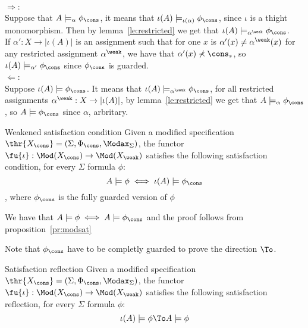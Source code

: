 \begin{PROOF}\\
$\Rightarrow$:\\ 
Suppose that $A \models_{\alpha} \phi_\cons$, it means that
$\iota(A) \models_{\iota(\alpha)} \phi_\cons$, since $\iota$ is a thight
monomorphism. Then by lemma~\ref{le:restricted} we get that $\iota(A)
\models_{\alpha^\weak} \phi_\cons$.\\ 
If $\alpha':X \to |\iota(A)|$ is an
assignment such that for one $x$ is $\alpha'(x) \neq \alpha^{\weak}(x)$ for
any restricted assignment $\alpha^{\weak}$, we have that $\alpha'(x)
\not\prec \cons_s$, so $\iota(A) \models_{\alpha'} \phi_\cons$ since
$\phi_\cons$ is guarded.\\ 
$\Leftarrow$: \\ 
Suppose $\iota(A) \models
\phi_\cons$. It means that $\iota(A) \models_{\alpha^{\weak}} \phi_\cons$,
for all restricted assignments $\alpha^{\weak}:X \to |\iota(A)|$, by
lemma~\ref{le:restricted} we get that $A \models_{\alpha} \phi_\cons$, so $A
\models \phi_\cons$ since $\alpha$, arbritary.
\end{PROOF}


\begin{corollary}{Weakened satisfaction condition}
\label{co:weaksat}
Given a modified specification
	$\thr{X_\cons}=(\Sigma,\Phi_\cons,\Modax_{\Sigma})$, the functor
	$\fu{\iota}: \Mod(X_\cons) \to \Mod(X_{\weak})$ satisfies the following
	satisfaction condition, for every $\Sigma$ formula $\phi$:
	\[ A \models \phi \iff \iota(A) \models \phi_\cons \]
, where $\phi_\cons$ is the fully guarded version of $\phi$
\end{corollary}

\begin{PROOF}
We have that $A \models \phi \iff A \models \phi_\cons$ and the proof follows from proposition~\ref{pr:modsat}
\end{PROOF}

Note that $\phi_\cons$ have to be completly guarded to prove the direction $\To$.

\begin{corollary}{Satisfaction reflection}
\label{co:satreflex}
Given a modified specification
	$\thr{X_\cons}=(\Sigma,\Phi_\cons,\Modax_{\Sigma})$, the functor
	$\fu{\iota}: \Mod(X_\cons) \to \Mod(X_{\weak})$ satisfies the following
	satisfaction reflection, for every $\Sigma$ formula $\phi$:
	\[ \iota(A) \models \phi \To A \models \phi \]

\end{corollary}

